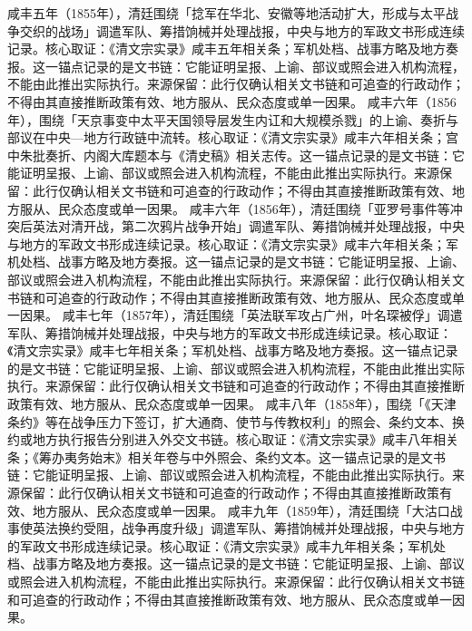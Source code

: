 咸丰五年（1855年），清廷围绕「捻军在华北、安徽等地活动扩大，形成与太平战争交织的战场」调遣军队、筹措饷械并处理战报，中央与地方的军政文书形成连续记录。核心取证：《清文宗实录》咸丰五年相关条；军机处档、战事方略及地方奏报。这一锚点记录的是文书链：它能证明呈报、上谕、部议或照会进入机构流程，不能由此推出实际执行。来源保留：此行仅确认相关文书链和可追查的行政动作；不得由其直接推断政策有效、地方服从、民众态度或单一因果。
咸丰六年（1856年），围绕「天京事变中太平天国领导层发生内讧和大规模杀戮」的上谕、奏折与部议在中央—地方行政链中流转。核心取证：《清文宗实录》咸丰六年相关条；宫中朱批奏折、内阁大库题本与《清史稿》相关志传。这一锚点记录的是文书链：它能证明呈报、上谕、部议或照会进入机构流程，不能由此推出实际执行。来源保留：此行仅确认相关文书链和可追查的行政动作；不得由其直接推断政策有效、地方服从、民众态度或单一因果。
咸丰六年（1856年），清廷围绕「亚罗号事件等冲突后英法对清开战，第二次鸦片战争开始」调遣军队、筹措饷械并处理战报，中央与地方的军政文书形成连续记录。核心取证：《清文宗实录》咸丰六年相关条；军机处档、战事方略及地方奏报。这一锚点记录的是文书链：它能证明呈报、上谕、部议或照会进入机构流程，不能由此推出实际执行。来源保留：此行仅确认相关文书链和可追查的行政动作；不得由其直接推断政策有效、地方服从、民众态度或单一因果。
咸丰七年（1857年），清廷围绕「英法联军攻占广州，叶名琛被俘」调遣军队、筹措饷械并处理战报，中央与地方的军政文书形成连续记录。核心取证：《清文宗实录》咸丰七年相关条；军机处档、战事方略及地方奏报。这一锚点记录的是文书链：它能证明呈报、上谕、部议或照会进入机构流程，不能由此推出实际执行。来源保留：此行仅确认相关文书链和可追查的行政动作；不得由其直接推断政策有效、地方服从、民众态度或单一因果。
咸丰八年（1858年），围绕「《天津条约》等在战争压力下签订，扩大通商、使节与传教权利」的照会、条约文本、换约或地方执行报告分别进入外交文书链。核心取证：《清文宗实录》咸丰八年相关条；《筹办夷务始末》相关年卷与中外照会、条约文本。这一锚点记录的是文书链：它能证明呈报、上谕、部议或照会进入机构流程，不能由此推出实际执行。来源保留：此行仅确认相关文书链和可追查的行政动作；不得由其直接推断政策有效、地方服从、民众态度或单一因果。
咸丰九年（1859年），清廷围绕「大沽口战事使英法换约受阻，战争再度升级」调遣军队、筹措饷械并处理战报，中央与地方的军政文书形成连续记录。核心取证：《清文宗实录》咸丰九年相关条；军机处档、战事方略及地方奏报。这一锚点记录的是文书链：它能证明呈报、上谕、部议或照会进入机构流程，不能由此推出实际执行。来源保留：此行仅确认相关文书链和可追查的行政动作；不得由其直接推断政策有效、地方服从、民众态度或单一因果。

